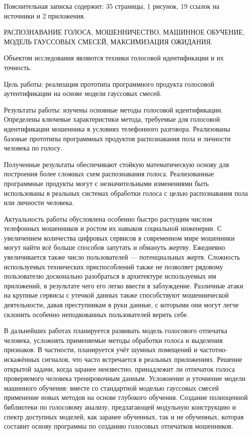 \documentclass[12pt]{gost-7-32}
\begin{document}
\sloppy

\essay

Пояснительная записка содержит: 35 страницы, 1 рисунок, 19 ссылок на источники и 2 приложения.

РАСПОЗНАВАНИЕ ГОЛОСА, МОШЕННИЧЕСТВО, МАШИННОЕ  ОБУЧЕНИЕ, МОДЕЛЬ ГАУССОВЫХ СМЕСЕЙ, МАКСИМИЗАЦИЯ ОЖИДАНИЯ.

Объектом исследования являются техники голосовой идентификации и их точность.

Цель работы: реализация прототипа программного продукта голосовой аутентификации на основе модели гауссовых смесей.

Результаты работы: изучены основные методы голосовой идентификации.
Определены ключевые характеристики метода, требуемые для голосовой идентификации мошенника в условиях телефонного разговора.
Реализованы базовые прототипы программных продуктов распознавания пола и личности человека по голосу.

Полученные результаты обеспечивают стойкую математическую основу для построения более сложных схем распознавания голоса.
Реализованные программные продукты могут с незначительными изменениями быть использованы в реальных системах обработки голоса с целью распознавания пола или личности человека.

Актуальность работы обусловлена особенно быстро растущим числом телефонных мошенников и ростом их навыков социальной инженерии.
С увеличением количества цифровых сервисов в современном мире мошенники могут найти всё больше способов запутать и обмануть жертву.
Ежедневно увеличивается также число пользователей --- потенциальных жертв.
Сложность используемых технических приспособлений также не позволяет рядовому пользователю досконально разобраться в архитектуре используемых им приложений, в результате чего его легко ввести в заблуждение.
Различные атаки на крупные сервисы с утечкой данных также способствуют мошеннической деятельности, давая преступникам в руки данные, с которыми они могут легче склонить особенно неподкованных пользователей верить себе.

В дальнейших работах планируется развивать модель голосового отпечатка человека, усложнять применяемые методы обработки голоса и выделения признаков.
В частности, планируется учёт шумных помещений и частотно-искажённых сигналов, что часто встречается в реальных приложениях.
Решение открытой задачи, когда заранее неизвестно, принадлежит ли отпечаток голоса проверяемого человека тренировочным данным.
Усложнение и уточнение модели машинного обучения: вместе со стандартной моделью гауссовых смесей применение новых методов на основе глубокого обучения.
Создание полноценной библиотеки по голосовому анализу, предлагающей модульную конструкцию и спектр доступных моделей, как заранее обученных, так и не обученных, которая составит основу программы по созданию голосовых отпечатков мошенников.
\end{document}
